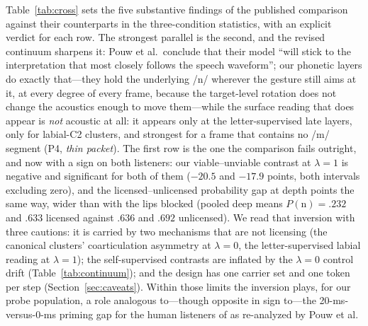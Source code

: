 \documentclass[11pt,a4paper]{article}
\newcommand{\lam}{\lambda}
\begin{document}
Table~\ref{tab:cross} sets the five substantive findings of the
published comparison against their counterparts in the three-condition
statistics, with an explicit verdict for each row. The strongest
parallel is the second, and the revised continuum sharpens it: Pouw
et al.\ conclude that their model ``will stick to the interpretation
that most closely follows the speech waveform''; our phonetic layers
do exactly that---they hold the underlying /n/ wherever the gesture
still aims at it, at every degree of every frame, because the
target-level rotation does not change the acoustics enough to move
them---while the surface reading that does appear is \emph{not}
acoustic at all: it appears only at the letter-supervised late
layers, only for labial-C2 clusters, and strongest for a frame that
contains no /m/ segment (P4, \emph{thin packet}). The first row is
the one the comparison fails outright, and now with a sign on both
listeners: our viable--unviable contrast at $\lam=1$ is negative
and significant for both of them ($-20.5$ and $-17.9$ points, both
intervals excluding zero), and the licensed--unlicensed probability
gap at depth points the same way, wider than with the lips blocked
(pooled deep means $P(\mathrm{n}) = .232$ and $.633$ licensed
against $.636$ and $.692$ unlicensed). We read that
inversion with three cautions: it is carried by two mechanisms that
are not licensing (the canonical clusters' coarticulation asymmetry
at $\lam=0$, the letter-supervised labial reading at $\lam=1$); the
self-supervised contrasts are inflated by the $\lam=0$ control drift
(Table~\ref{tab:continuum}); and the design has one carrier set and
one token per step (Section~\ref{sec:caveats}). Within those limits
the inversion plays, for our probe population, a role analogous
to---though opposite in sign to---the 20-ms-versus-0-ms priming gap
for the human listeners of \citet{gmw2001} as re-analyzed by Pouw
et al.
\end{document}
